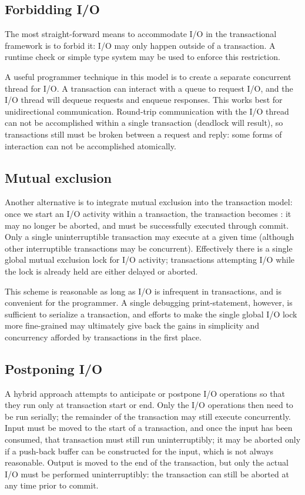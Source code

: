 \subsection{Forbidding I/O}
The most straight-forward means to accommodate I/O in the
transactional framework is to forbid it: I/O may only happen outside
of a transaction.  A runtime check or simple type system may be used
to enforce this restriction.

A useful programmer technique in this model is to create a separate concurrent
thread for I/O.  A transaction can interact with a queue to request
I/O, and the I/O thread will dequeue requests and enqueue responses.
This works best for unidirectional communication.
Round-trip communication with the I/O thread can not be accomplished
within a single transaction (deadlock will result), so transactions
still must be broken between a request and reply: some forms of
interaction can not be accomplished atomically.

\subsection{Mutual exclusion}
Another alternative is to integrate mutual exclusion into the
transaction model: once we start an I/O activity within a transaction,
the transaction becomes : it may no longer be
aborted, and must be successfully executed through commit.
Only a single uninterruptible transaction may execute at a given time
(although other interruptible transactions may be concurrent).
Effectively there is a single global mutual exclusion lock for I/O
activity; transactions attempting I/O while the lock is already held
are either delayed or aborted.

This scheme is reasonable as long as I/O is infrequent in
transactions, and is convenient for the programmer.
A single debugging print-statement, however, is sufficient to
serialize a transaction, and efforts to make the single global I/O
lock more fine-grained may ultimately give back the gains in
simplicity and concurrency afforded by transactions in the first place.

\subsection{Postponing I/O}
A hybrid approach attempts to anticipate or postpone I/O operations so
that they run only at transaction start or end.
Only the I/O operations then need to be run serially; the remainder of
the transaction may still execute concurrently.  Input must be moved
to the start of a transaction, and once the input has been consumed,
that transaction must still run uninterruptibly; it may be aborted
only if a push-back buffer can be constructed for the input, which is
not always reasonable.  Output is moved to the end of the transaction,
but only the actual I/O must be performed uninterruptibly: the
transaction can still be aborted at any time prior to commit.

